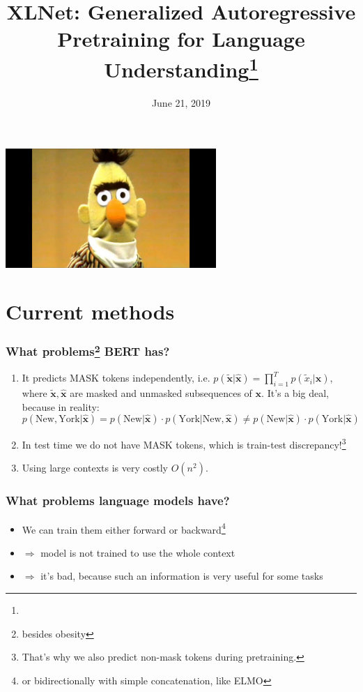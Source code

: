 \documentclass[10pt]{beamer}
\title{XLNet: Generalized Autoregressive Pretraining for Language Understanding\footnote{\citepaper{xlnet}}\vspace{-3.0em}}
\date{June 21, 2019}
\begin{document}
\begin{frame}
    \titlepage
    \centering
    \includegraphics[width=0.6\textwidth]{images/sad-bert.jpg}
\end{frame}


\section{Current methods}
\begin{frame}
\frametitle{What problems\footnote{besides obesity} BERT has?}

\begin{enumerate}
    \item\pause It predicts MASK tokens independently, i.e.
$p(\bm{\tilde{x}} | \bm{\hat x}) = \prod_{i=1}^T p(\tilde{x}_i | \bm{\hat x})$, where $\bm{\tilde x}, \bm{\hat x}$ are masked and unmasked subsequences of $\bm x$.  It's a big deal, because in reality:
    \[
    p(\text{New}, \text{York} | \bm{\hat x}) = p(\text{New} | \bm{\hat x}) \cdot p(\text{York} | \text{New}, \bm{\hat x}) \neq p(\text{New} | \bm{\hat x}) \cdot p(\text{York} | \bm{\hat x})
    \]
    \pause\item In test time we do not have MASK tokens, which is train-test discrepancy!\footnote{That's why we also predict non-mask tokens during pretraining.}
    \item\pause Using large contexts is very costly $O(n^2)$.
\end{enumerate}

\end{frame}


\begin{frame}
    \frametitle{What problems language models have?}
    
    \begin{itemize}
        \item\pause We can train them either forward or backward\footnote{or bidirectionally with simple concatenation, like ELMO}
        \item\pause $\Longrightarrow$ model is not trained to use the whole context
        \item\pause $\Longrightarrow$ it's bad, because such an information is very useful for some tasks
    \end{itemize}
\end{frame}
\end{document}
